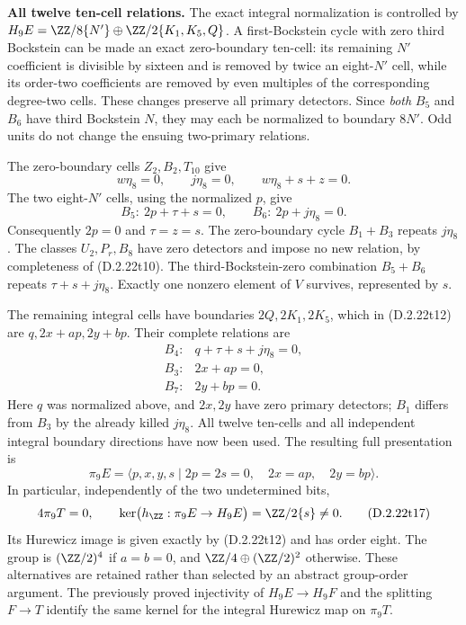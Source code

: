\medskip\noindent
\textbf{All twelve ten-cell relations.}
The exact integral normalization is controlled by
$H_9E=\ZZ/8\{N'\}\oplus\ZZ/2\{K_1,K_5,Q\}$.
A first-Bockstein cycle with zero third Bockstein can be
made an exact zero-boundary ten-cell: its remaining $N'$
coefficient is divisible by sixteen and is removed by twice
an eight-$N'$ cell, while its order-two coefficients are
removed by even multiples of the corresponding degree-two
cells.  These changes preserve all primary detectors.
Since \emph{both} $B_5$ and $B_6$ have third Bockstein $N$,
they may each be normalized to boundary $8N'$.
Odd units do not change the ensuing two-primary relations.

The zero-boundary cells $Z_2,B_2,T_{10}$ give
\[
 w\eta_8=0,
       \qquad j\eta_8=0,
       \qquad w\eta_8+s+z=0.
 \tag{D.2.22t13}
\]
The two eight-$N'$ cells, using the normalized $p$, give
\[
 B_5:\ 2p+\tau+s=0,
       \qquad B_6:\ 2p+j\eta_8=0.
 \tag{D.2.22t14}
\]
Consequently $2p=0$ and $\tau=z=s$.
The zero-boundary cycle $B_1+B_3$ repeats $j\eta_8$.
The classes $U_2,P_r,B_8$ have zero detectors and impose
no new relation, by completeness of \textup{(D.2.22t10)}.
The third-Bockstein-zero combination $B_5+B_6$ repeats
$\tau+s+j\eta_8$.  Exactly one nonzero element of $V$
survives, represented by $s$.

The remaining integral cells have boundaries
$2Q,2K_1,2K_5$, which in \textup{(D.2.22t12)} are
$q,2x+ap,2y+bp$.  Their complete relations are
\[
 \begin{array}{ll}
 B_4:&q+\tau+s+j\eta_8=0,\\
 B_3:&2x+ap=0,\\
 B_7:&2y+bp=0.
 \end{array}
 \tag{D.2.22t15}
\]
Here $q$ was normalized above, and $2x,2y$ have zero
primary detectors; $B_1$ differs from $B_3$ by the already
killed $j\eta_8$.  All twelve ten-cells and all independent
integral boundary directions have now been used.
The resulting full presentation is
\[
 \pi_9E=
 \langle p,x,y,s\mid
       2p=2s=0,\quad2x=ap,\quad2y=bp\rangle.
 \tag{D.2.22t16}
\]
In particular, independently of the two undetermined bits,
\[
 4\pi_9T=0,
 \qquad
 \ker\bigl(h_{\ZZ}:\pi_9E\to H_9E\bigr)
       =\ZZ/2\{s\}\ne0.
 \tag{D.2.22t17}
\]
Its Hurewicz image is given exactly by
\textup{(D.2.22t12)} and has order eight.
The group is $(\ZZ/2)^4$ if $a=b=0$, and
$\ZZ/4\oplus(\ZZ/2)^2$ otherwise.
These alternatives are retained rather than selected by
an abstract group-order argument.
The previously proved injectivity of $H_9E\to H_9F$
and the splitting $F\to T$ identify the same kernel for
the integral Hurewicz map on $\pi_9T$.

